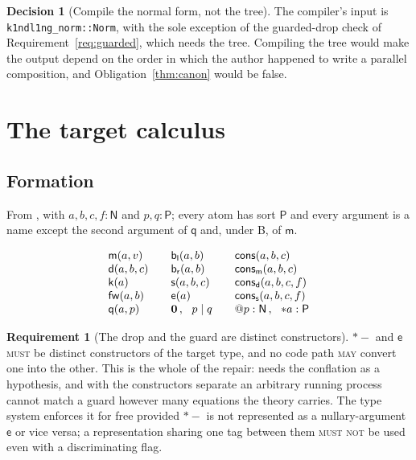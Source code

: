 \documentclass[11pt,a4paper]{article}
\makeatletter
\newcommand{\code}[1]{\texttt{#1}}
\newcommand{\MUST}{\textsc{must}}
\newcommand{\MUSTNOT}{\textsc{must not}}
\newcommand{\MAY}{\textsc{may}}
\newcommand{\quo}[1]{@#1}
\newcommand{\drp}[1]{{*}#1}
\newcommand{\nil}{\mathbf{0}}
\newcommand{\Nsort}{\mathsf{N}}
\newcommand{\Psort}{\mathsf{P}}
\newcommand{\mm}{\mathsf{m}}
\newcommand{\dd}{\mathsf{d}}
\newcommand{\kk}{\mathsf{k}}
\newcommand{\fw}{\mathsf{fw}}
\newcommand{\bl}{\mathsf{b}_{\mathsf{l}}}
\newcommand{\br}{\mathsf{b}_{\mathsf{r}}}
\newcommand{\sy}{\mathsf{s}}
\newcommand{\ev}{\mathsf{e}}
\newcommand{\qq}{\mathsf{q}}
\newcommand{\cons}{\mathsf{cons}}
\theoremstyle{definition}
\newtheorem{requirement}[definition]{Requirement}
\newtheorem{decision}[definition]{Decision}
\theoremstyle{plain}
\makeatother
\begin{document}
\begin{decision}[Compile the normal form, not the tree]
The compiler's input is \code{k1ndl1ng\_norm::Norm}, with the sole exception
of the guarded-drop check of Requirement~\ref{req:guarded}, which needs the
tree. Compiling the tree would make the output depend on the order in which
the author happened to write a parallel composition, and
Obligation~\ref{thm:canon} would be false.
\end{decision}

\section{The target calculus}\label{sec:target}

\subsection{Formation}

From \cite[\S3.2]{draft3}, with $a,b,c,f : \Nsort$ and $p,q : \Psort$; every
atom has sort $\Psort$ and every argument is a name except the second
argument of $\qq$ and, under B, of $\mm$.

\[
\begin{array}{l@{\qquad}l@{\qquad}l}
 \mm(a,v) & \bl(a,b) & \cons(a,b,c)\\
 \dd(a,b,c) & \br(a,b) & \cons_{\mm}(a,b,c)\\
 \kk(a) & \sy(a,b,c) & \cons_{\dd}(a,b,c,f)\\
 \fw(a,b) & \ev(a) & \cons_{\sy}(a,b,c,f)\\
 \qq(a,p) & \nil \,,\ \ p \mid q & \quo{p} : \Nsort \,,\ \ \drp{a} : \Psort
\end{array}
\]

\begin{requirement}[The drop and the guard are distinct constructors]
\label{req:noconflation}
$\drp{-}$ and $\ev$ \MUST{} be distinct constructors of the target type, and
no code path \MAY{} convert one into the other. This is the whole of the
repair: \cite[Prop.~3.5]{draft3} needs the conflation as a hypothesis, and
with the constructors separate an arbitrary running process cannot match a
guard however many equations the theory carries. The type system enforces it
for free provided $\drp{-}$ is not represented as a nullary-argument $\ev$ or
vice versa; a representation sharing one tag between them \MUSTNOT{} be used
even with a discriminating flag.
\end{requirement}
\end{document}
